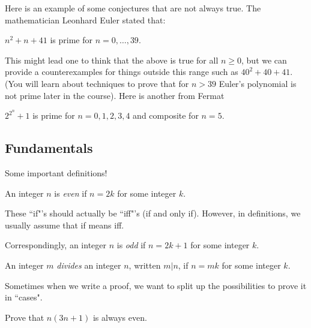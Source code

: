 Here is an example of some conjectures that are not always true. The mathematician Leonhard Euler stated that:
\begin{conjecture}
$n^2 + n + 41$ is prime for $n = 0, \dots, 39$.
\end{conjecture}
This might lead one to think that the above is true for all $n\geq0$, but we can provide a counterexamples for things outside this range such as $40^2 + 40 + 41$. (You will learn about techniques to prove that for $n>39$ Euler's polynomial is not prime later in the course).
Here is another from Fermat
\begin{conjecture}
$2^{2^n} + 1$ is prime for $n = 0, 1, 2,3,4$ and composite for $n=5$.
\end{conjecture}


\subsection{Fundamentals}

Some important definitions!

\begin{definition}[Evenness]
An integer $n$ is \textit{even} if $n = 2k$ for some integer $k$.
\end{definition}

These ``if"'s should actually be ``iff"'s (if and only if). However, in definitions, we usually assume that if means iff.

\begin{definition}[Oddness]
Correspondingly, an integer $n$ is \textit{odd} if $n = 2k+1$ for some integer $k$. 
\end{definition}

\begin{definition}[Divisibility]
An integer $m$ \textit{divides} an integer $n$, written $m|n$, if $n = mk$ for some integer $k$.
\end{definition}

\begin{definition}[Casework]
Sometimes when we write a proof, we want to split up the possibilities to prove it in ``cases".
\end{definition}

\begin{example}
Prove that $n(3n + 1)$ is always even. 
\end{example}

